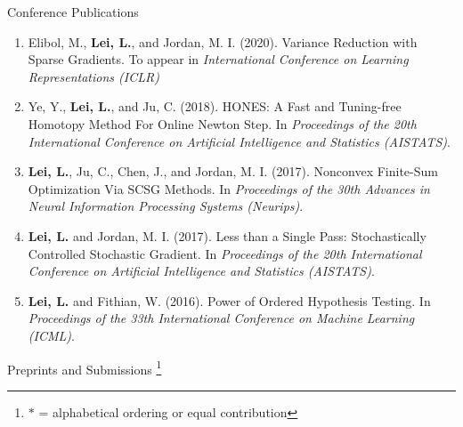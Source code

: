 \documentclass{article}
\begin{document}
\begin{large}
\noindent Conference Publications
\end{large}

\begin{enumerate}
\item Elibol, M., \textbf{Lei, L.}, and Jordan, M. I. (2020). Variance Reduction with Sparse Gradients. To appear in \emph{International Conference on Learning Representations (ICLR)}
\item Ye, Y., \textbf{Lei, L.}, and Ju, C. (2018). HONES: A Fast and Tuning-free Homotopy Method For Online Newton Step. In \emph{Proceedings of the 20th International Conference on Artificial Intelligence and Statistics (AISTATS)}.
\item \textbf{Lei, L.}, Ju, C., Chen, J., and Jordan, M. I. (2017). Nonconvex Finite-Sum Optimization Via SCSG Methods. In \emph{Proceedings of the 30th Advances in Neural Information Processing Systems (Neurips)}.
\item \textbf{Lei, L.} and Jordan, M. I. (2017). Less than a Single Pass: Stochastically Controlled Stochastic Gradient. In \emph{Proceedings of the 20th International Conference on Artificial Intelligence and Statistics (AISTATS)}.
\item \textbf{Lei, L.} and Fithian, W. (2016). Power of Ordered Hypothesis Testing. In \emph{Proceedings of the 33th International Conference on Machine Learning (ICML)}.
\end{enumerate}

\begin{large}
\noindent Preprints and Submissions \footnote{$\ast$ = alphabetical ordering or equal contribution}
\end{large}
\end{document}
